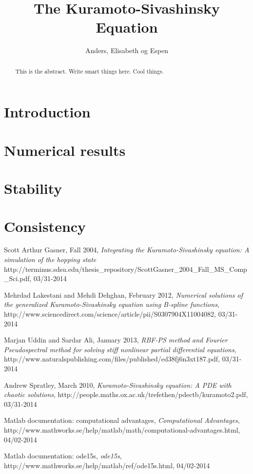 \documentclass[10pt,a4paper]{article}
\begin{document}
\title{The Kuramoto-Sivashinsky Equation}
\author{Anders, Elisabeth og Espen}
\maketitle

\begin{abstract}
This is the abstract. Write smart things here. Cool things.
\end{abstract}



\section{Introduction}


\section{Numerical results}


\section{Stability}


\section{Consistency}




\begin{thebibliography}{9}

Scott Arthur Gasner, Fall 2004,
\emph{Integrating the Kuramoto-Sivashinsky equation: A simulation of the hopping state}
http://terminus.sdsu.edu/thesis\_repository/ScottGasner\_2004\_Fall\_MS\_Comp\_Sci.pdf, 03/31-2014

Mehrdad Lakestani and Mehdi Dehghan, February 2012,
\emph{Numerical solutions of the generalized Kuramoto-Sivashinsky equation using B-spline functions},
http://www.sciencedirect.com/science/article/pii/S0307904X11004082, 03/31-2014

Marjan Uddin and Sardar Ali, January 2013,
\emph{RBF-PS method and Fourier Pseudospectral method for solving stiff 
nonlinear partial differential equations},
http://www.naturalspublishing.com/files/published/ed38fj6n3xt187.pdf, 03/31-2014

Andrew Spratley, March 2010,
\emph{Kuramoto-Sivashinsky equation: A PDE with chaotic solutions},
http://people.maths.ox.ac.uk/trefethen/pdectb/kuramoto2.pdf, 03/31-2014

Matlab documentation: computational advantages,
\emph{Computational Advantages},
http://www.mathworks.se/help/matlab/math/computational-advantages.html, 04/02-2014

Matlab documentation: ode15s,
\emph{ode15s},
http://www.mathworks.se/help/matlab/ref/ode15s.html, 04/02-2014


\end{thebibliography}

\end{document}

